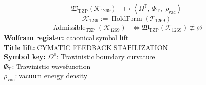 \noindent
\begin{minipage}[t]{0.48\linewidth}
\begingroup
\small
\[
\begin{aligned}
\mathfrak{W}_{\mathrm{TZP}}\!\left(\mathcal{K}_{1269}\right)
&\longmapsto
\left\langle \Omega^{\mathbb{T}},\; \Psi_{\mathrm{T}},\; \rho_{\mathrm{vac}} \right\rangle
\end{aligned}
\]
\[
\mathcal{K}_{1269}
:=
\operatorname{HoldForm}\!\left(\mathcal{T}_{1269}\right)
\]
\[
\begin{aligned}
\operatorname{Admissible}_{\mathrm{TZP}}\!\left(\mathcal{K}_{1269}\right)
&\Longleftrightarrow
\mathfrak{W}_{\mathrm{TZP}}\!\left(\mathcal{K}_{1269}\right)\not\equiv\varnothing
\end{aligned}
\]
\textbf{Wolfram register:} canonical symbol lift\\
\textbf{Title lift:} CYMATIC FEEDBACK STABILIZATION\\
\textbf{Symbol key:} \(\Omega^{\mathbb{T}}\): Trawinistic boundary curvature\\ \(\Psi_{\mathrm{T}}\): Trawinistic wavefunction\\ \(\rho_{\mathrm{vac}}\): vacuum energy density
\par
\endgroup
\end{minipage}\hfill
